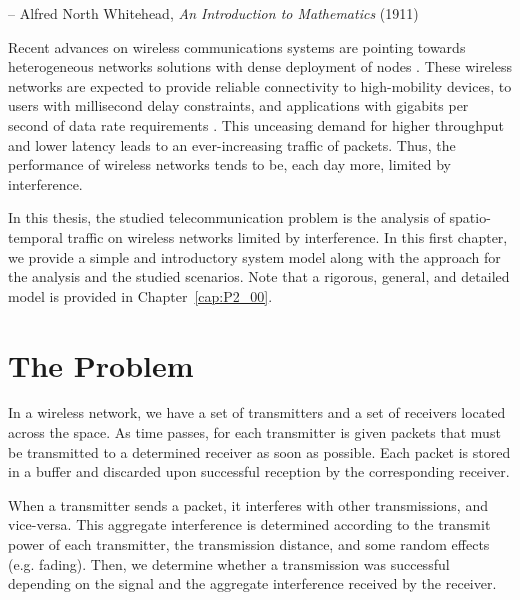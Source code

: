 {-- Alfred North Whitehead, \textit{An Introduction to Mathematics} (1911)}

Recent advances on wireless communications systems are pointing towards heterogeneous networks solutions with dense deployment of nodes \cite{hossain2014evolution}.
%
These wireless networks are expected to provide reliable connectivity to high-mobility devices, to users with millisecond delay constraints, and applications with gigabits per second of data rate requirements \cite{peng2015recent}.
%
This unceasing demand for higher throughput and lower latency leads to an ever-increasing traffic of packets.
%
Thus, the performance of wireless networks tends to be, each day more, limited by interference. %

In this thesis, the studied telecommunication problem is the analysis of spatio-temporal traffic on wireless networks limited by interference.
%
In this first chapter, we provide a simple and introductory system model along with the approach for the analysis and the studied scenarios.
%
Note that a rigorous, general, and detailed model is provided in Chapter~\ref{cap:P2_00}.

\newpage
\section{The Problem}

In a wireless network, we have a set of transmitters and a set of receivers located across the space.
%
As time passes, for each transmitter is given packets that must be transmitted to a determined receiver as soon as possible.
%
Each packet is stored in a buffer and discarded upon successful reception by the corresponding receiver.

When a transmitter sends a packet, it interferes with other transmissions, and vice-versa. This aggregate interference is determined according to the transmit power of each transmitter, the transmission distance, and some random effects (e.g. fading).
%
Then, we determine whether a transmission was successful depending on the signal and the aggregate interference received by the receiver.

